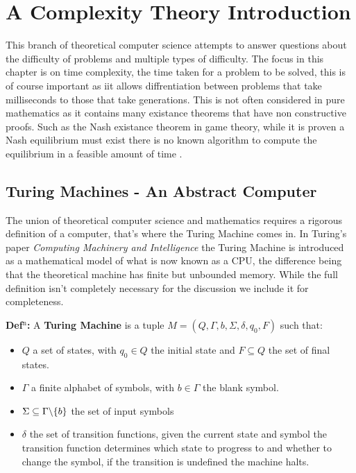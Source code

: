 \documentclass[a4paper,11pt]{report}
\begin{document}
\section{A Complexity Theory Introduction}

This branch of theoretical computer science attempts to answer questions about the difficulty of problems and multiple types of difficulty. The focus in this chapter is on time complexity, the time taken for a problem to be solved, this is of course important as iit allows diffrentiation between problems that take milliseconds to those that take generations. This is not often considered in pure mathematics as it contains many existance theorems that have non constructive proofs. Such as the Nash existance theorem in game theory, while it is proven a Nash equilibrium must exist there is no known algorithm to compute the equilibrium in a feasible amount of time \cite{ppad}.

\subsection{Turing Machines - An Abstract Computer}

The union of theoretical computer science and mathematics requires a rigorous definition of a computer, that's where the Turing Machine comes in. In Turing's paper \textit{Computing Machinery and Intelligence} \cite{turing} the Turing Machine is introduced as a mathematical model of what is now known as a CPU, the difference being that the theoretical machine has finite but unbounded memory. While the full definition isn't completely necessary for the discussion we include it for completeness.

\textbf{Def$^\text{n}$:} A \textbf{Turing Machine} is a tuple $M=(Q,\Gamma,b,\Sigma, \delta, q_0, F)$ such that:
\begin{itemize}
\item $Q$  a set of states, with $q_0\in Q$ the initial state and $F\subseteq Q$ the set of final states.
\item $\Gamma$ a finite alphabet of symbols, with $b\in \Gamma$ the blank symbol.
\item $\Sigma\subseteq \Gamma \symbol{92} \{b\}$ the set of input symbols
\item $\delta$ the set of transition functions, given the current state and symbol the transition function determines which state to progress to and whether to change the symbol, if the transition is undefined the machine halts.
\end{itemize}
\end{document}

